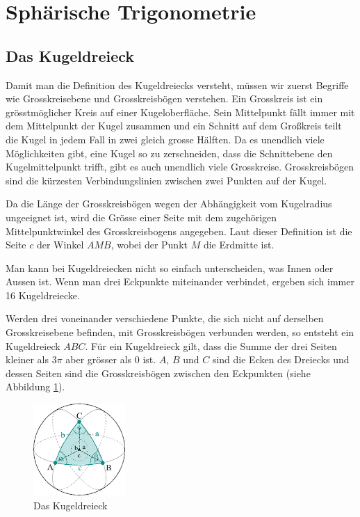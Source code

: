 
\section{Sphärische Trigonometrie}

\subsection{Das Kugeldreieck}
Damit man die Definition des Kugeldreiecks versteht, müssen wir zuerst Begriffe wie Grosskreisebene und Grosskreisbögen verstehen.
Ein Grosskreis ist ein grösstmöglicher Kreis auf einer Kugeloberfläche.
Sein Mittelpunkt fällt immer mit dem Mittelpunkt der Kugel zusammen und ein Schnitt auf dem Großkreis teilt die Kugel in jedem Fall in zwei gleich grosse Hälften.
Da es unendlich viele Möglichkeiten gibt, eine Kugel so zu zerschneiden, dass die Schnittebene den Kugelmittelpunkt trifft, gibt es auch unendlich viele Grosskreise.
Grosskreisbögen sind die kürzesten Verbindungslinien zwischen zwei Punkten auf der Kugel.

Da die Länge der Grosskreisbögen wegen der Abhängigkeit vom Kugelradius ungeeignet ist, wird die Grösse einer Seite mit dem zugehörigen Mittelpunktwinkel des Grosskreisbogens angegeben. 
Laut dieser Definition ist die Seite $c$ der Winkel $AMB$, wobei der Punkt $M$ die Erdmitte ist.

Man kann bei Kugeldreiecken nicht so einfach unterscheiden, was Innen oder Aussen ist. 
Wenn man drei Eckpunkte miteinander verbindet, ergeben sich immer 16 Kugeldreiecke. 

Werden drei voneinander verschiedene Punkte, die sich nicht auf derselben Grosskreisebene befinden, mit Grosskreisbögen verbunden werden, so entsteht ein Kugeldreieck $ABC$.
Für ein Kugeldreieck gilt, dass die Summe der drei Seiten kleiner als $3\pi$ aber grösser als 0 ist.
$A$, $B$ und $C$ sind die Ecken des Dreiecks und dessen Seiten sind die Grosskreisbögen zwischen den Eckpunkten (siehe Abbildung \ref{kugel}). 

\begin{figure}
	\begin{center}
		\includegraphics[width=3.5cm]{papers/nav/bilder/kugel1.png}
		\caption[Das Kugeldreieck]{Das Kugeldreieck}
		\label{kugel}
	\end{center}
	
\end{figure}

